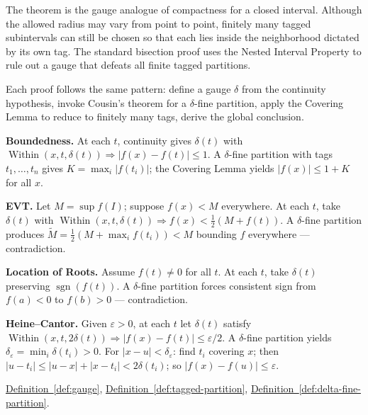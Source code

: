 \begin{remark*}[Interpretation]
The theorem is the gauge analogue of compactness for a closed interval.
Although the allowed radius may vary from point to point, finitely many
tagged subintervals can still be chosen so that each lies inside the
neighborhood dictated by its own tag. The standard bisection proof uses
the Nested Interval Property to rule out a gauge that defeats all finite
tagged partitions.


Each proof follows the same pattern: define a gauge $\delta$ from
the continuity hypothesis, invoke Cousin's theorem for a $\delta$-fine
partition, apply the Covering Lemma to reduce to finitely many tags,
derive the global conclusion.

\medskip
\textbf{Boundedness.} At each $t$, continuity gives $\delta(t)$ with
$\operatorname{Within}(x,t,\delta(t))\Rightarrow|f(x)-f(t)|\leq 1$.
A $\delta$-fine partition with tags $t_1,\ldots,t_n$ gives
$K=\max_i|f(t_i)|$; the Covering Lemma yields $|f(x)|\leq 1+K$ for
all $x$.

\medskip
\textbf{EVT.} Let $M=\sup f(I)$; suppose $f(x)<M$ everywhere. At
each $t$, take $\delta(t)$ with
$\operatorname{Within}(x,t,\delta(t))\Rightarrow f(x)<\tfrac{1}{2}(M+f(t))$.
A $\delta$-fine partition produces $\widetilde{M}=\tfrac{1}{2}(M+\max_if(t_i))<M$
bounding $f$ everywhere --- contradiction.

\medskip
\textbf{Location of Roots.} Assume $f(t)\neq 0$ for all $t$. At
each $t$, take $\delta(t)$ preserving $\operatorname{sgn}(f(t))$. A
$\delta$-fine partition forces consistent sign from $f(a)<0$ to
$f(b)>0$ --- contradiction.

\medskip
\textbf{Heine--Cantor.} Given $\varepsilon>0$, at each $t$ let
$\delta(t)$ satisfy $\operatorname{Within}(x,t,2\delta(t))
\Rightarrow|f(x)-f(t)|\leq\varepsilon/2$. A $\delta$-fine partition
yields $\delta_\varepsilon=\min_i\delta(t_i)>0$. For $|x-u|<\delta_\varepsilon$:
find $t_i$ covering $x$; then $|u-t_i|\leq|u-x|+|x-t_i|<2\delta(t_i)$;
so $|f(x)-f(u)|\leq\varepsilon$.
\end{remark*}


\begin{dependencies}
\hyperref[def:gauge]{Definition~\ref*{def:gauge}},
\hyperref[def:tagged-partition]{Definition~\ref*{def:tagged-partition}},
\hyperref[def:delta-fine-partition]{Definition~\ref*{def:delta-fine-partition}}.
\end{dependencies}

